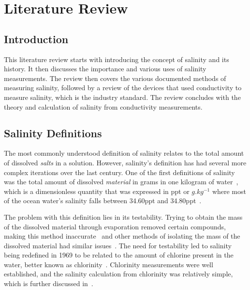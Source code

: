 
\chapter{Literature Review}\label{ch:literature}

\section{Introduction}

This literature review starts with introducing the concept of salinity and its history.
It then discusses the importance and various uses of salinity measurements.
The review then covers the various documented methods of measuring salinity, followed by a review of the devices that used conductivity to measure salinity, which is the industry standard.
The review concludes with the theory and calculation of salinity from conductivity measurements.

\section{Salinity Definitions}\label{sec:a-brief-history-of-salinity}
The most commonly understood definition of salinity relates to the total amount of dissolved \textit{salts} in a solution. However, salinity's definition has had several more complex iterations over the last century.
One of the first definitions of salinity was the total amount of dissolved \textit{material} in grams in one kilogram of water~\cite{stewart_introduction_to_physical_oceanography_2004}, which is a dimensionless quantity that was expressed in \gls{ppt} or $g.kg^{-1}$ where most of the ocean water's salinity falls between 34.60\gls{ppt} and 34.80\gls{ppt}~\cite{stewart_introduction_to_physical_oceanography_2004}.

The problem with this definition lies in its testability.
Trying to obtain the mass of the dissolved material through evaporation removed certain compounds, making this method inaccurate~\cite{sverdrup_ocean_physics_and_chemistry_1942} and other methods of isolating the mass of the dissolved material had similar issues~\cite{stewart_introduction_to_physical_oceanography_2004}. 
The need for testability led to salinity being redefined in 1969 to be related to the amount of chlorine present in the water, better known as chlorinity~\cite{stewart_introduction_to_physical_oceanography_2004}.
Chlorinity measurements were well established, and the salinity calculation from chlorinity was relatively simple, which is further discussed in~.

